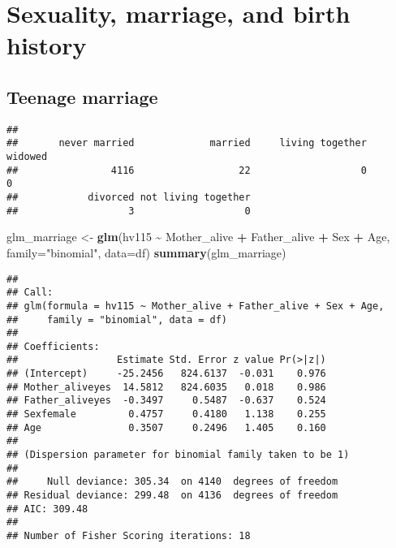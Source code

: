 \documentclass[
]{article}
\newenvironment{Shaded}{\begin{snugshade}}{\end{snugshade}}
\newcommand{\AttributeTok}[1]{\textcolor[rgb]{0.13,0.29,0.53}{#1}}
\newcommand{\FunctionTok}[1]{\textcolor[rgb]{0.13,0.29,0.53}{\textbf{#1}}}
\newcommand{\NormalTok}[1]{#1}
\newcommand{\OtherTok}[1]{\textcolor[rgb]{0.56,0.35,0.01}{#1}}
\newcommand{\SpecialCharTok}[1]{\textcolor[rgb]{0.81,0.36,0.00}{\textbf{#1}}}
\newcommand{\StringTok}[1]{\textcolor[rgb]{0.31,0.60,0.02}{#1}}
\begin{document}
\hypertarget{sexuality-marriage-and-birth-history}{%
\section{Sexuality, marriage, and birth
history}\label{sexuality-marriage-and-birth-history}}

\hypertarget{teenage-marriage}{%
\subsection{Teenage marriage}\label{teenage-marriage}}

\begin{Shaded}
\end{Shaded}

\begin{verbatim}
## 
##       never married             married     living together             widowed 
##                4116                  22                   0                   0 
##            divorced not living together 
##                   3                   0
\end{verbatim}

\begin{Shaded}
\begin{Highlighting}[]
\NormalTok{glm\_marriage }\OtherTok{\textless{}{-}} \FunctionTok{glm}\NormalTok{(hv115 }\SpecialCharTok{\textasciitilde{}}\NormalTok{ Mother\_alive }\SpecialCharTok{+}\NormalTok{ Father\_alive }\SpecialCharTok{+}\NormalTok{ Sex }\SpecialCharTok{+}\NormalTok{ Age,}
                      \AttributeTok{family=}\StringTok{"binomial"}\NormalTok{, }\AttributeTok{data=}\NormalTok{df)}
\FunctionTok{summary}\NormalTok{(glm\_marriage)}
\end{Highlighting}
\end{Shaded}

\begin{verbatim}
## 
## Call:
## glm(formula = hv115 ~ Mother_alive + Father_alive + Sex + Age, 
##     family = "binomial", data = df)
## 
## Coefficients:
##                 Estimate Std. Error z value Pr(>|z|)
## (Intercept)     -25.2456   824.6137  -0.031    0.976
## Mother_aliveyes  14.5812   824.6035   0.018    0.986
## Father_aliveyes  -0.3497     0.5487  -0.637    0.524
## Sexfemale         0.4757     0.4180   1.138    0.255
## Age               0.3507     0.2496   1.405    0.160
## 
## (Dispersion parameter for binomial family taken to be 1)
## 
##     Null deviance: 305.34  on 4140  degrees of freedom
## Residual deviance: 299.48  on 4136  degrees of freedom
## AIC: 309.48
## 
## Number of Fisher Scoring iterations: 18
\end{verbatim}
\end{document}
